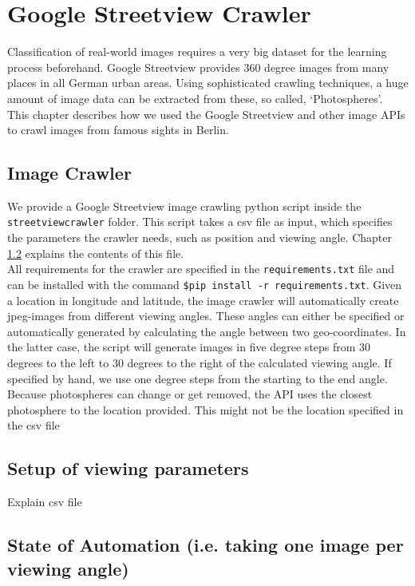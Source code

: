\section{Google Streetview Crawler}
Classification of real-world images requires a very big dataset for the learning process beforehand. Google Streetview provides 360 degree images from many places in all German urban areas. Using sophisticated crawling techniques, a huge amount of image data can be extracted from these, so called, `Photospheres'.\\
This chapter describes how we used the Google Streetview and other image APIs to crawl images from famous sights in Berlin.

\subsection{Image Crawler}
We provide a Google Streetview image crawling python script inside the \texttt{streetviewcrawler} folder. This script takes a csv file as input, which specifies the parameters the crawler needs, such as position and viewing angle. Chapter \ref{csv_file} explains the contents of this file.\\
All requirements for the crawler are specified in the \texttt{requirements.txt} file and can be installed with the command \texttt{\$pip install -r requirements.txt}.
Given a location in longitude and latitude, the image crawler will automatically create jpeg-images from different viewing angles. These angles can either be specified or automatically generated by calculating the angle between two geo-coordinates. In the latter case, the script will generate images in five degree steps from 30 degrees to the left to 30 degrees to the right of the calculated viewing angle. If specified by hand, we use one degree steps from the starting to the end angle.\\
Because photospheres can change or get removed, the API uses the closest photosphere to the location provided. This might not be the location specified in the csv file

\subsection{Setup of viewing parameters}\label{csv_file}
Explain csv file

\subsection{State of Automation (i.e. taking one image per viewing angle)}


